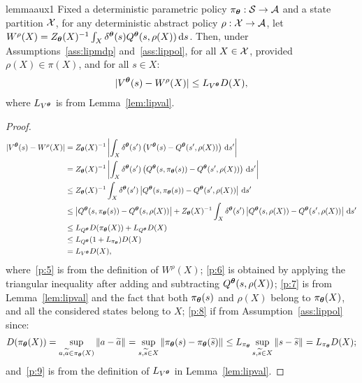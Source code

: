 \begin{restatable}{lemma}{aux1}\label{lem:aux1}
	Fixed a deterministic parametric policy $\pi_{\boldsymbol{\theta}}:\mathcal{S}\to\mathcal{A}$ and a state partition $\mathcal{X}$, for any deterministic abstract policy $\rho:\mathcal{X}\to\mathcal{A}$, let $W^{\rho}(X) = Z_{\boldsymbol{\theta}}(X)^{-1}\int_{X}\delta^{\boldsymbol{\theta}}(s)Q^{\boldsymbol{\theta}}(s,\rho(X))\,\mathrm{d} s$. Then, under Assumptions~\ref{ass:lipmdp} and~\ref{ass:lippol}, for all $X\in\mathcal{X}$, provided $\rho(X) \in \pi(X)$, and for all $s\in X$:
	\begin{align*}
	|V^{\boldsymbol{\theta}}(s) - W^{\rho}(X)| \leq L_{V^{\boldsymbol{\theta}}}D(X),
	\end{align*}
	where $L_{V^{\boldsymbol{\theta}}}$ is from Lemma~\ref{lem:lipval}.
\end{restatable}
\begin{proof}
	\begin{align}
	|V^{\boldsymbol{\theta}}(s) - W^{\rho}(X)| 
	&= Z_{\boldsymbol{\theta}}(X)^{-1}\left|\int_{X}\delta^{\boldsymbol{\theta}}(s')\left(V^{\boldsymbol{\theta}}(s) - Q^{\boldsymbol{\theta}}(s',\rho(X))\right)\,\mathrm{d} s'\right| \label{p:5}\\
	&= Z_{\boldsymbol{\theta}}(X)^{-1}\left|\int_{X}\delta^{\boldsymbol{\theta}}(s')\left(Q^{\boldsymbol{\theta}}(s,\pi_{\boldsymbol{\theta}}(s)) - Q^{\boldsymbol{\theta}}(s',\rho(X))\right)\,\mathrm{d} s'\right| \nonumber\\
	&\leq Z_{\boldsymbol{\theta}}(X)^{-1}\int_{X}\delta^{\boldsymbol{\theta}}(s')\left|Q^{\boldsymbol{\theta}}(s,\pi_{\boldsymbol{\theta}}(s)) - Q^{\boldsymbol{\theta}}(s',\rho(X))\right|\,\mathrm{d} s' \nonumber\\
	&\leq \left|Q^{\boldsymbol{\theta}}(s,\pi_{\boldsymbol{\theta}}(s)) - Q^{\boldsymbol{\theta}}(s,\rho(X))\right| +  Z_{\boldsymbol{\theta}}(X)^{-1}\int_{X}\delta^{\boldsymbol{\theta}}(s')\left|Q^{\boldsymbol{\theta}}(s,\rho(X)) - Q^{\boldsymbol{\theta}}(s',\rho(X))\right|\,\mathrm{d} s' \label{p:6}\\
	&\leq L_{Q^{\boldsymbol{\theta}}}D(\pi_{\boldsymbol{\theta}}(X)) +  L_{Q^{\boldsymbol{\theta}}}D(X) \label{p:7}\\
	&\leq L_{Q^{\boldsymbol{\theta}}}(1+L_{\pi_{\boldsymbol{\theta}}})D(X) \label{p:8}\\
	&= L_{V^{\boldsymbol{\theta}}}D(X),\label{p:9}
	\end{align}
	where~\eqref{p:5} is from the definition of $W^{\rho}(X)$; \eqref{p:6} is obtained by applying the triangular inequality after adding and subtracting $Q^{\boldsymbol{\theta}}(s,\rho(X))$; \eqref{p:7} is from Lemma~\ref{lem:lipval} and the fact that both $\pi_{\boldsymbol{\theta}}(s)$ and $\rho(X)$ belong to $\pi_{\boldsymbol{\theta}}(X)$, and all the considered states belong to $X$; \eqref{p:8} if from Assumption~\ref{ass:lippol} since: 
	\begin{align}
	D(\pi_{\boldsymbol{\theta}}(X)) = \sup_{a,\widetilde{a}\in\pi_{\boldsymbol{\theta}}(X)}\left\|a-\widetilde{a}\right\|_{} = \sup_{s,\widetilde{s}\in X}\left\|\pi_{\boldsymbol{\theta}}(s)-\pi_{\boldsymbol{\theta}}(\widetilde{s})\right\|_{} \leq L_{\pi_{\boldsymbol{\theta}}}\sup_{s,\widetilde{s}\in X}\left\|s-\widetilde{s}\right\|_{} = L_{\pi_{\boldsymbol{\theta}}}D(X);
	\end{align} 
	and~\eqref{p:9} is from the definition of $L_{V^{\boldsymbol{\theta}}}$ in Lemma~\ref{lem:lipval}.
\end{proof}

